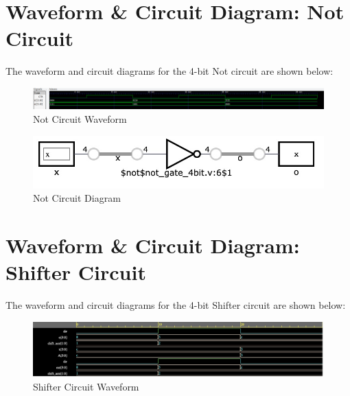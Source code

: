 \documentclass[runningheads, 12pt]{report}
\begin{document}
	\section{Waveform \& Circuit Diagram: Not Circuit}
	
	The waveform and circuit diagrams for the 4-bit Not circuit are shown below:
	
\begin{figure}[h]
	\centering
	\includegraphics[scale=0.625]{gtk_not_4bit}
	\caption{Not Circuit Waveform}
	\label{fig: gtk_not_4bit}
\end{figure}

\begin{figure}[h]
	\centering
	\includegraphics[width=1.0\textwidth]{not_4bit}
	\caption{Not Circuit Diagram}
	\label{fig: not_4bit}
\end{figure}
\pagebreak

	\section{Waveform \& Circuit Diagram: Shifter Circuit}	
	
	The waveform and circuit diagrams for the 4-bit Shifter circuit are shown below:

\begin{figure}[h]
	\centering
	\includegraphics[scale=0.25]{Shifter_waveform}
	\caption{Shifter Circuit Waveform}
	\label{fig: Shifter_waveform}
\end{figure}
\end{document}

